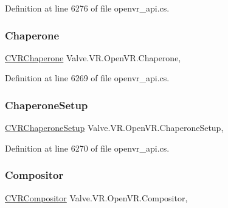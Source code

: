 Definition at line 6276 of file openvr\+\_\+api.\+cs.

\mbox{\label{class_valve_1_1_v_r_1_1_open_v_r_a28a1938fe526eed643dfc0be4d16be1e}} 
\subsubsection{\texorpdfstring{Chaperone}{Chaperone}}
{\footnotesize\ttfamily \mbox{\hyperlink{class_valve_1_1_v_r_1_1_c_v_r_chaperone}{C\+V\+R\+Chaperone}} Valve.\+V\+R.\+Open\+V\+R.\+Chaperone\hspace{0.3cm}{\ttfamily [static]}, {\ttfamily [get]}}



Definition at line 6269 of file openvr\+\_\+api.\+cs.

\mbox{\label{class_valve_1_1_v_r_1_1_open_v_r_aebaf4a6bd9c7d3831c0210c4af1764b4}} 
\subsubsection{\texorpdfstring{ChaperoneSetup}{ChaperoneSetup}}
{\footnotesize\ttfamily \mbox{\hyperlink{class_valve_1_1_v_r_1_1_c_v_r_chaperone_setup}{C\+V\+R\+Chaperone\+Setup}} Valve.\+V\+R.\+Open\+V\+R.\+Chaperone\+Setup\hspace{0.3cm}{\ttfamily [static]}, {\ttfamily [get]}}



Definition at line 6270 of file openvr\+\_\+api.\+cs.

\mbox{\label{class_valve_1_1_v_r_1_1_open_v_r_a398bc817d8516416f480aed933599ac5}} 
\subsubsection{\texorpdfstring{Compositor}{Compositor}}
{\footnotesize\ttfamily \mbox{\hyperlink{class_valve_1_1_v_r_1_1_c_v_r_compositor}{C\+V\+R\+Compositor}} Valve.\+V\+R.\+Open\+V\+R.\+Compositor\hspace{0.3cm}{\ttfamily [static]}, {\ttfamily [get]}}



